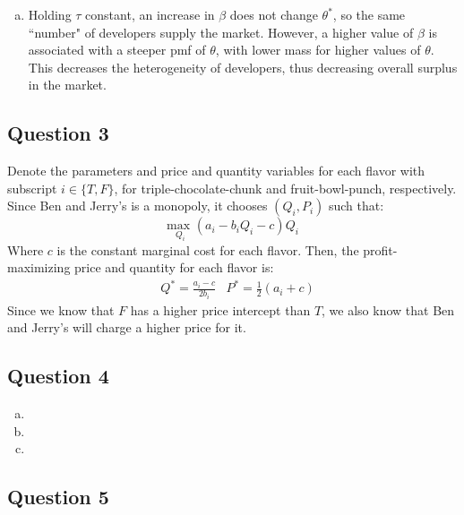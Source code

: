 \documentclass{article}
\newcommand{\usmax}[1]{\underset{#1}{\text{max }}}
\begin{document}
\begin{enumerate}[(a)]
	\item Holding $\tau$ constant, an increase in $\beta$ does not change $\theta^*$, so the same ``number" of developers supply the market. However, a higher value of $\beta$ is associated with a steeper pmf of $\theta$, with lower mass for higher values of $\theta$. This decreases the heterogeneity of developers, thus decreasing overall surplus in the market.
	
\end{enumerate}


\subsection*{Question 3}

Denote the parameters and price and quantity variables for each flavor with subscript $i\in\{T,F\}$, for triple-chocolate-chunk and fruit-bowl-punch, respectively. Since Ben and Jerry's is a monopoly, it chooses $(Q_i,P_i)$ such that:
\[
	\usmax{Q_i}(a_i-b_iQ_i - c)Q_i
\]
Where $c$ is the constant marginal cost for each flavor. Then, the profit-maximizing price and quantity for each flavor is:
\begin{align*}
	&Q^* = \frac{a_i-c}{2b_i} 	&P^* = \frac{1}{2}(a_i + c)
\end{align*}
Since we know that $F$ has a higher price intercept than $T$, we also know that Ben and Jerry's will charge a higher price for it.



\subsection*{Question 4}

\begin{enumerate}[(a)]
	\item 
	
	\item 
	
	\item 
	
\end{enumerate}




\subsection*{Question 5}




\end{document}
